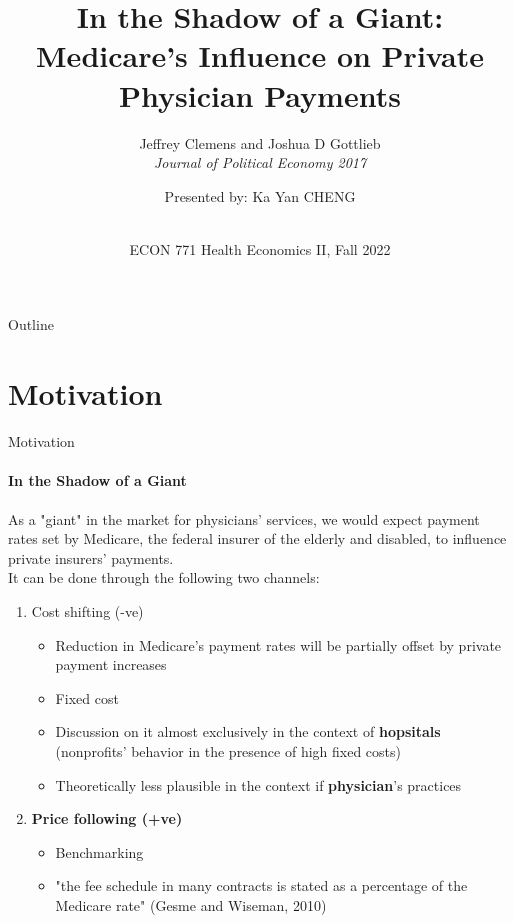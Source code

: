 \documentclass{beamer}
\title{In the Shadow of a Giant: Medicare's Influence on Private Physician Payments}
\subtitle{Jeffrey Clemens and Joshua D Gottlieb\\ \textit{Journal of Political Economy 2017}}
\author{Presented by: Ka Yan CHENG}
\date{ \vspace*{-1cm}\\ ECON 771 Health Economics II, Fall 2022}
\begin{document}
\begin{frame}
    \titlepage 
\end{frame}

\logo{}


\begin{frame}{Outline}
    \tableofcontents
\end{frame}


\section{Motivation}

\begin{frame}{Motivation}
\framesubtitle{In the Shadow of a Giant}
As a "giant" in the  market for physicians' services, we would expect payment rates set by Medicare, the federal insurer of the elderly and disabled, to influence private insurers' payments.\\
\hfill \break
It can be done through the following two channels:
\begin{enumerate}
\item Cost shifting (-ve)
\begin{itemize}
\item Reduction in Medicare's payment rates will be partially offset by private payment increases
\item Fixed cost
\item Discussion on it almost exclusively in the context of \textbf{hopsitals} (nonprofits' behavior in the presence of high fixed costs)
\item Theoretically less plausible in the context if \textbf{physician}'s practices
\end{itemize}
\item \textbf{Price following (+ve)} 
\begin{itemize}
\item Benchmarking
\item "the fee schedule in many contracts is stated as a percentage of the Medicare rate" (Gesme and Wiseman, 2010)
\end{itemize}
\end{enumerate}
\end{frame}
\end{document}
